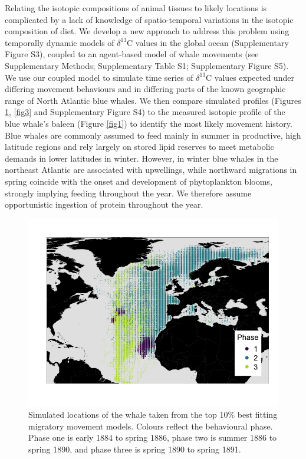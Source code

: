 \documentclass[a4paper,12pt]{article}
\begin{document}
Relating the isotopic compositions of animal tissues to likely locations is complicated by a lack of knowledge of spatio-temporal variations in the isotopic composition of diet\cite{west2006stable,mcmahon2015millennial}.
We develop a new approach to address this problem using temporally dynamic models of $\delta^{13}$C values in the global ocean\cite{magozzi2017using} (Supplementary Figure S3), coupled to an agent-based model of whale movements (see Supplementary Methods; Supplementary Table S1; Supplementary Figure S5).  
We use our coupled model to simulate time series of $\delta^{13}$C values expected under differing movement behaviours and in differing parts of the known geographic range of North Atlantic blue whales. 
We then compare simulated profiles (Figures \ref{fig2}, \ref{fig3} and Supplementary Figure S4) to the measured isotopic profile of the blue whale's baleen (Figure \ref{fig1}) to identify the most likely movement history. 
Blue whales are commonly assumed to feed mainly in summer in productive, high latitude regions and rely largely on stored lipid reserves to meet metabolic demands in lower latitudes in winter. 
However, in winter blue whales in the northeast Atlantic are associated with upwellings\cite{baines2017autumn}, while northward migrations in spring coincide with the onset and development of phytoplankton blooms\cite{silva2013north,visser2011timing,busquets2017estimating}, strongly implying feeding throughout the year. 
We therefore assume opportunistic ingestion of protein throughout the year. 

\begin{figure}
 \centering
 \includegraphics[width = \linewidth]{figures/Figure-2-points.png}
  \caption{Simulated locations of the whale taken from the top 10\% best fitting migratory movement models. 
  Colours reflect the behavioural phase. 
  Phase one is early 1884 to spring 1886, phase two is summer 1886 to spring 1890, and phase three is spring 1890 to spring 1891.}
  \label{fig2}
\end{figure}
\end{document}
